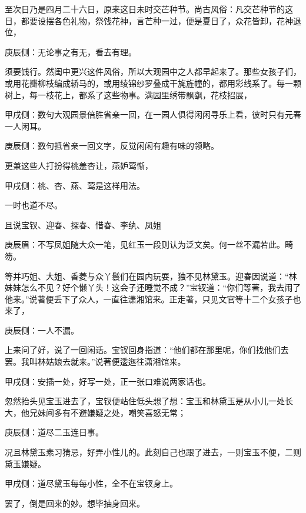 \begin{parag}
    至次日乃是四月二十六日，原来这日未时交芒种节。尚古风俗：凡交芒种节的这日，都要设摆各色礼物，祭饯花神，言芒种一过，便是夏日了，众花皆卸，花神退位，\begin{note}庚辰侧：无论事之有无，看去有理。\end{note}须要饯行。然闺中更兴这件风俗，所以大观园中之人都早起来了。那些女孩子们，或用花瓣柳枝编成轿马的，或用绫锦纱罗叠成干旄旌幢的，都用彩线系了。每一颗树上，每一枝花上，都系了这些物事。满园里绣带飘飖，花枝招展，\begin{note}甲戌侧：数句大观园景倍胜省亲一回，在一园人俱得闲闲寻乐上看，彼时只有元春一人闲耳。\end{note}\begin{note}庚辰侧：数句抵省亲一回文字，反觉闲闲有趣有味的领略。\end{note}更兼这些人打扮得桃羞杏让，燕妒莺惭，\begin{note}甲戌侧：桃、杏、燕、莺是这样用法。\end{note}一时也道不尽。
\end{parag}


\begin{parag}
    且说宝钗、迎春、探春、惜春、李纨、凤姐\begin{note}庚辰眉：不写凤姐随大众一笔，见红玉一段则认为泛文矣。何一丝不漏若此。畸笏。\end{note}等并巧姐、大姐、香菱与众丫鬟们在园内玩耍，独不见林黛玉。迎春因说道：“林妹妹怎么不见？好个懒丫头！这会子还睡觉不成？”宝钗道：“你们等著，我去闹了他来。”说著便丢下了众人，一直往潇湘馆来。正走著，只见文官等十二个女孩子也来了，\begin{note}庚辰侧：一人不漏。\end{note}上来问了好，说了一回闲话。宝钗回身指道：“他们都在那里呢，你们找他们去罢。我叫林姑娘去就来。”说著便逶迤往潇湘馆来。\begin{note}甲戌侧：安插一处，好写一处，正一张口难说两家话也。\end{note}忽然抬头见宝玉进去了，宝钗便站住低头想了想：宝玉和林黛玉是从小儿一处长大，他兄妹间多有不避嫌疑之处，嘲笑喜怒无常；\begin{note}庚辰侧：道尽二玉连日事。\end{note}况且林黛玉素习猜忌，好弄小性儿的。此刻自己也跟了进去，一则宝玉不便，二则黛玉嫌疑。\begin{note}甲戌侧：道尽黛玉每每小性，全不在宝钗身上。\end{note}罢了，倒是回来的妙。想毕抽身回来。
\end{parag}


